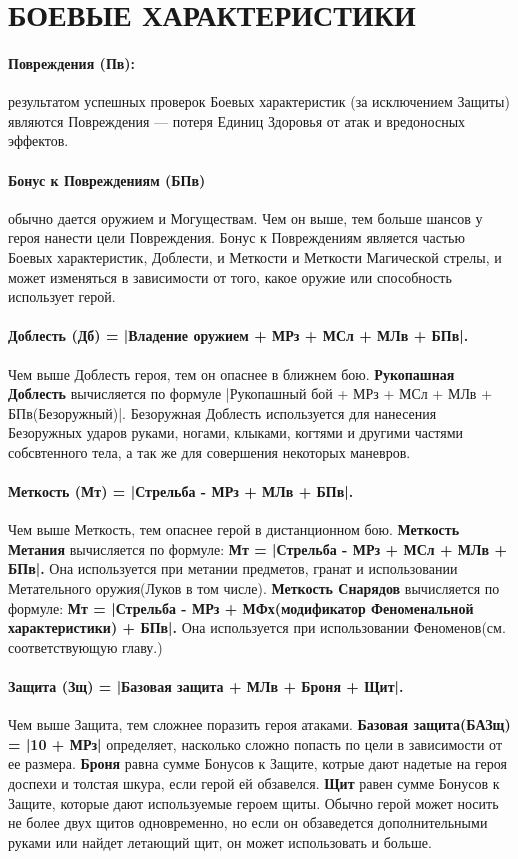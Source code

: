 \section{БОЕВЫЕ ХАРАКТЕРИСТИКИ}
\paragraph{Повреждения (Пв):} результатом успешных проверок Боевых характеристик (за исключением Защиты) являются Повреждения — потеря Единиц Здоровья от атак и вредоносных эффектов.
\paragraph{Бонус к Повреждениям (БПв)} обычно дается оружием и Могуществам. Чем он выше, тем больше шансов у героя нанести цели Повреждения. Бонус к Повреждениям является частью Боевых характеристик, Доблести, и Меткости и Меткости Магической стрелы, и может изменяться в зависимости от того, какое оружие или способность использует герой.
\paragraph{Доблесть (Дб) = |Владение оружием + МРз + МСл + МЛв + БПв|.} Чем выше Доблесть героя, тем он опаснее в ближнем бою.
\newline \textbf{Рукопашная Доблесть} вычисляется по формуле |Рукопашный бой + МРз + МСл + МЛв + БПв(Безоружный)|. Безоружная Доблесть используется для нанесения Безоружных ударов руками, ногами, клыками, когтями и другими частями собсвтенного тела, а так же для совершения некоторых маневров.
\paragraph{Меткость (Мт) = |Стрельба - МРз + МЛв + БПв|.} Чем выше Меткость, тем опаснее герой в дистанционном бою.
\newline \textbf{Меткость Метания} вычисляется по формуле: \textbf{Мт = |Стрельба - МРз + МСл + МЛв + БПв|.} Она используется при метании предметов, гранат и использовании Метательного оружия(Луков в том числе).
\newline \textbf{Меткость Снарядов} вычисляется по формуле: \textbf{Мт = |Стрельба - МРз + МФх(модификатор Феноменальной характеристики) + БПв|.} Она используется при использовании Феноменов(см. соответствующую главу.)
\paragraph{Защита (Зщ) = |Базовая защита + МЛв + Броня + Щит|.} Чем выше Защита, тем сложнее поразить героя атаками.
\newline \textbf{Базовая защита(БАЗщ) = |10 + МРз|} определяет, насколько сложно попасть по цели в зависимости от ее размера.
\newline \textbf{Броня} равна сумме Бонусов к Защите, котрые дают надетые на героя доспехи и толстая шкура, если герой ей обзавелся.
\newline \textbf{Щит} равен сумме Бонусов к Защите, которые дают используемые героем щиты. Обычно герой может носить не более двух щитов одновременно, но если он обзаведется дополнительными руками или найдет летающий щит, он может использовать и больше.
